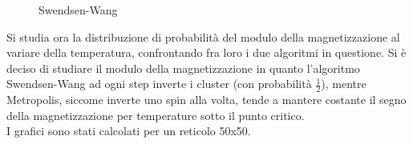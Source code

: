 \begin{figure}[h]
\centering
	\caption{Swendsen-Wang}
\end{figure}
Si studia ora la distribuzione di probabilità del modulo della magnetizzazione al variare della temperatura, confrontando fra loro i due algoritmi in questione.
Si è deciso di studiare il modulo della magnetizzazione in quanto l'algoritmo Swendsen-Wang ad ogni step inverte i cluster (con probabilità $\frac{1}{2}$), mentre Metropolis, siccome inverte uno spin alla volta, tende a mantere costante il segno della magnetizzazione per temperature sotto il punto critico.\\
I grafici sono stati calcolati per un reticolo 50x50.

